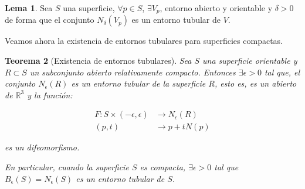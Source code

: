 \documentclass[paper=a4, fontsize=11pt, spanish]{scrartcl}
\newcommand{\rtres}{\mathbb{R}^3}
\newtheorem{theorem}{Teorema}[section]
\theoremstyle{definition}
\newtheorem{lemma}[theorem]{Lema}
\theoremstyle{definition}
\theoremstyle{definition}
\begin{document}
\begin{lemma}
Sea $S$ una superficie, $\forall p \in S$, $\exists V_p$, entorno abierto y orientable y $\delta > 0$ de forma que el conjunto $N_\delta(V_p)$ es un entorno tubular de $V$.
\end{lemma}

Veamos ahora la existencia de entornos tubulares para superficies compactas.
\begin{theorem}[Existencia de entornos tubulares]
Sea $S$ una superficie orientable y $R \subset S$ un subconjunto abierto relativamente compacto. Entonces $\exists \epsilon > 0$ tal que, el conjunto $N_\epsilon(R)$ es un entorno tubular de la superficie $R$, esto es, es un abierto de $\rtres$ y la función:

\begin{align*}
    F: S \times (-\epsilon, \epsilon) &\longrightarrow N_\epsilon(R) \\
    (p,t) &\longrightarrow p + tN(p)
\end{align*}

es un difeomorfismo.

En particular, cuando la superficie $S$ es compacta, $\exists \epsilon > 0$ tal que
$B_\epsilon(S)=N_\epsilon(S)$ es un entorno tubular de $S$.
\end{theorem}
\end{document}
